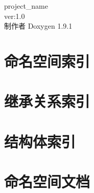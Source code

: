 \let\mypdfximage\pdfximage\def\pdfximage{\immediate\mypdfximage}\documentclass[twoside]{book}
\newcommand{\+}{\discretionary{\mbox{\scriptsize$\hookleftarrow$}}{}{}}
\newcommand{\clearemptydoublepage}{%
  \newpage{\pagestyle{empty}\cleardoublepage}%
}
\begin{document}
\raggedbottom
\begin{CJK}{UTF8}{gbsn}

\hypersetup{pageanchor=false,
             bookmarksnumbered=true,
             pdfencoding=unicode
            }
\begin{titlepage}
\vspace*{7cm}
\begin{center}%
{\Large project\+\_\+name \\[1ex]\large ver\+:1.\+0 }\\
\vspace*{1cm}
{\large 制作者 Doxygen 1.9.1}\\
\end{center}
\end{titlepage}
\clearemptydoublepage
{}
\tableofcontents
\clearemptydoublepage
{}
\hypersetup{pageanchor=true}

\chapter{命名空间索引}

\chapter{继承关系索引}

\chapter{结构体索引}

\chapter{命名空间文档}


\end{CJK}
\end{document}
